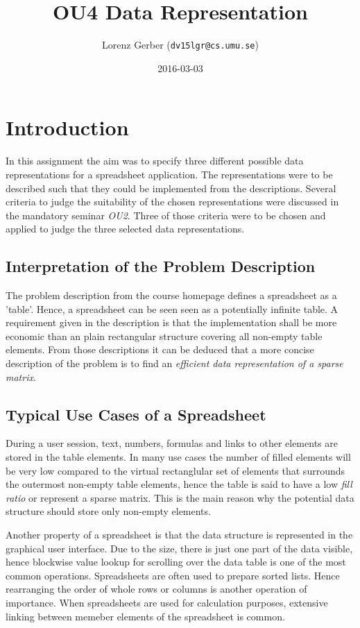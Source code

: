 \documentclass[a4paper,11pt,twoside]{article}
\title{OU4 Data Representation}
\author{Lorenz Gerber ({\tt{dv15lgr@cs.umu.se}})}
\date{2016-03-03}
\begin{document}
\lstset{language=C}
\maketitle
\thispagestyle{empty}
\newpage
\tableofcontents
\thispagestyle{empty}
\newpage

\clearpage
{}

\section{Introduction} 
In this assignment the aim was to specify three different possible
data representations for a spreadsheet application. The
representations were to be described such that they could be implemented
from the descriptions. Several criteria to judge the suitability of
the chosen representations were discussed in the mandatory seminar
\emph{OU2}. Three of those criteria were to be chosen and applied to judge the
three selected data representations.


\subsection{Interpretation of the Problem Description}
The problem description from the course homepage defines a spreadsheet
as a 'table'. Hence, a spreadsheet can be seen seen as a potentially
infinite table. A requirement given in the description is that the
implementation shall be more economic than an plain rectangular
structure covering all non-empty table elements. From those
descriptions it can be deduced that a more concise description of
the problem is to find an \emph{efficient data representation of a
 sparse matrix}.


\subsection{Typical Use Cases of a Spreadsheet}
During a user session, text, numbers, formulas and links to
other elements are stored in the table elements. In many use cases the
number of filled elements will be very low compared to the virtual
rectanglular set of elements that surrounds the outermost non-empty
table elements, hence the table is said to have a low \emph{fill
 ratio} or represent a sparse matrix. This is the main reason why the
potential data structure should store only non-empty elements.

Another property of a spreadsheet is that the data
structure is represented in the graphical user interface. Due to the
size, there is just one part of the data visible, hence blockwise
value lookup for scrolling over the data table is one of the most
common operations. Spreadsheets are often used to prepare sorted
lists. Hence rearranging the order of whole rows or columns is another
operation of importance. When spreadsheets are used for calculation
purposes, extensive linking between memeber elements of the
spreadsheet is common.
\end{document}
